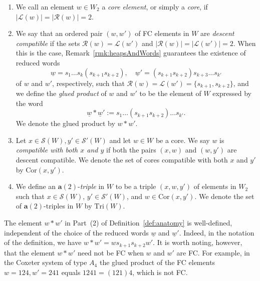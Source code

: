 \documentclass[ALCO,Unicode,published]{cedram}
\newcommand{\call}{\mathcal{L}}
\newcommand{\calr}{\mathcal{R}}
\newcommand{\cals}{\mathcal{S}}
\newcommand{\la}{\mathbf{a}}
\newcommand{\sw}{\mathcal{S}(W)}
\newcommand{\ul}{\underline}
\newcommand{\triples}{\mathrm{Tri}(W) }
\newcommand{\cores}{\mathrm{Cor}}
\newcommand{\abs}[1]{\lvert #1 \rvert}
\begin{document}
\begin{definition}
\label{def:anatomy}
\begin{enumerate}
    \item We call an element $w\in W_2$ a \emph{core element}, or simply a \emph{core}, if
         $\abs{\call(w)}=\abs{\calr(w)}=2$.
    \item We say that an ordered pair $(w,w')$ of FC elements in $W$ are \emph{descent compatible}
         if the sets $\calr(w)=\call(w')$ and $\abs{\calr(w)}=\abs{\call(w')}=2$.  When this is the
         case, Remark~\ref{rmk:heapsAndWords} guarantees the existence of reduced words 
        \begin{equation*} \ul w=s_1\dots s_{k}(s_{k+1}s_{k+2}), \quad \ul w'
              =(s_{k+1}s_{k+2})s_{k+3}\dots s_{k'}
        \end{equation*} of $w$ and $w'$, respectively, such that
            $\calr(w)=\call(w')=\{s_{k+1},s_{k+2}\}$, and we define the \emph{glued product} of $w$
            and $w'$ to be the element of $W$ expressed by the word \[ \ul w*\ul w':=s_1\dots
            (s_{k+1}s_{k+2})\dots s_{k'}.  \] We denote the glued product by $w*w'$.
    \item Let $x\in \sw, y'\in \cals'(W)$ and let $w\in W$ be a core. We say $w$ is \emph{compatible
         with both $x$ and $y$} if both the pairs $(x,w)$ and $(w,y')$ are descent compatible. We
         denote the set of cores compatible with both $x$ and $y'$ by $\cores(x,y')$. 
    \item We define an $\la(2)$-\emph{triple} in $W$ to be a triple $(x,w,y')$ of elements in $W_2$
         such that $x\in \sw$, $y'\in \cals'(W)$, and $w\in\cores(x,y')$.  We denote the set of
         $\la(2)$-triples in $W$ by $\triples$.
\end{enumerate}
\end{definition}

\begin{remark}
    \label{rmk:glue}
    The element $w*w'$ in Part~(2) of Definition~\ref{def:anatomy} is well-defined, independent of the choice
    of the reduced words $\ul w$ and $\ul w'$. Indeed, in the notation of the definition, we have
    $w*w'=w{s_{k+1}s_{k+2}}w'$. It is worth noting, however, that the element $w*w'$ need not be FC
    when $w$ and $w'$ are FC. For example, in the Coxeter system of type $A_4$ the glued product of
    the FC elements $w=124,w'=241$ equals $1241=(121)4$, which is not FC.
\end{remark}
\end{document}
